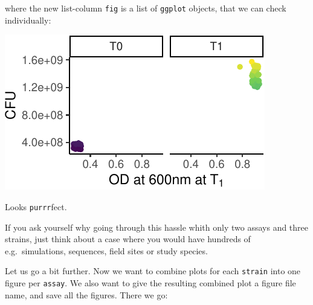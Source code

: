 \documentclass[]{book}
\newenvironment{Shaded}{}{}
\newcommand{\CommentTok}[1]{\textcolor[rgb]{0.38,0.63,0.69}{\textit{#1}}}
\newcommand{\DataTypeTok}[1]{\textcolor[rgb]{0.56,0.13,0.00}{#1}}
\newcommand{\DecValTok}[1]{\textcolor[rgb]{0.25,0.63,0.44}{#1}}
\newcommand{\KeywordTok}[1]{\textcolor[rgb]{0.00,0.44,0.13}{\textbf{#1}}}
\newcommand{\NormalTok}[1]{#1}
\newcommand{\OperatorTok}[1]{\textcolor[rgb]{0.40,0.40,0.40}{#1}}
\newcommand{\StringTok}[1]{\textcolor[rgb]{0.25,0.44,0.63}{#1}}
\begin{document}
where the new list-column \texttt{fig} is a list of \texttt{ggplot} objects, that we can check individually:

\begin{Shaded}
\end{Shaded}

\begin{center}\includegraphics[width=\textwidth]{TRES-Tidy-Tutorial_files/figure-latex/unnamed-chunk-156-1} \end{center}

Looks \texttt{purrr}fect.

If you ask yourself why going through this hassle whith only two assays and three strains, just think about a case where you would have hundreds of e.g.~simulations, sequences, field sites or study species.

Let us go a bit further. Now we want to combine plots for each \texttt{strain} into one figure per \texttt{assay}. We also want to give the resulting combined plot a figure file name, and save all the figures. There we go:

\begin{Shaded}
\end{Shaded}
\end{document}
